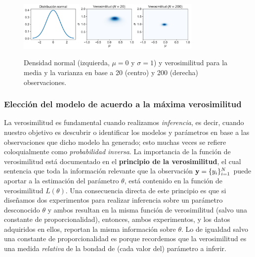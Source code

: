 \begin{mdframed}[style=ejemplo, frametitle={\center Ejemplo: Verosimilitud para el modelo gaussiano  (muestras  independientes)}]
\begin{figure}[H]
	\centering
	\includegraphics[width=0.8\textwidth, frame]{img/cap2_gaussian_likelihood}\\
	\caption{Densidad normal (izquierda, $\mu=0$ y $\sigma=1$) y verosimilitud para la media y la varianza en base a 20 (centro) y 200 (derecha) observaciones.}
	\label{fig:gaussian_likelihood}  
\end{figure}
  
\end{mdframed}

\subsubsection{Elección del modelo de acuerdo a la máxima verosimilitud}

La verosimilitud es fundamental cuando realizamos \emph{inferencia}, es decir, cuando nuestro objetivo es descubrir o identificar los modelos y parámetros en base a las observaciones que dicho modelo ha generado; esto muchas veces se refiere coloquialmente como \emph{probabilidad inversa}. La importancia de la función de verosimilitud está documentado en el \textbf{principio de la verosimilitud}, el cual sentencia que toda la información relevante que la observación $\mathbf{y} = \{y_i\}_{i=1}^N$ puede aportar a la estimación del parámetro $\theta$, está contenido en la función  de verosimilitud $L(\theta)$. Una consecuencia directa de este principio es que si diseñamos dos experimentos para realizar  inferencia  sobre un parámetro desconocido $\theta$ y ambos  resultan en la misma función de verosimilitud  (salvo una constante de proporcionalidad), entonces,  ambos experimentos, y los datos adquiridos en  ellos, reportan la misma  información  sobre $\theta$. Lo de igualdad salvo una constante de proporcionalidad es porque recordemos que la verosimilitud es una medida \emph{relativa} de la bondad de (cada valor del) parámetro a inferir. \\

